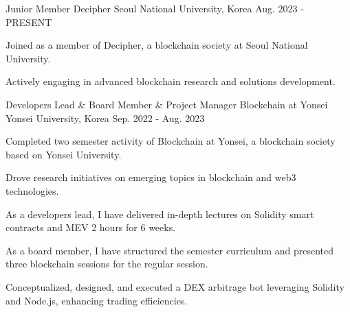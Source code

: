 


\begin{cventries}


\cventry
{Junior Member} %
{Decipher} %
{Seoul National University, Korea} %
{Aug. 2023 - PRESENT} %
{ %
\begin{cvitems}
\item {Joined as a member of Decipher, a blockchain society at Seoul National University.}
\item {Actively engaging in advanced blockchain research and solutions development.}
\end{cvitems}
}


\cventry
{Developers Lead \& Board Member \& Project Manager} %
{Blockchain at Yonsei} %
{Yonsei University, Korea} %
{Sep. 2022 - Aug. 2023} %
{ %
\begin{cvitems}
\item {Completed two semester activity of Blockchain at Yonsei, a blockchain society based on Yonsei University.}
\item {Drove research initiatives on emerging topics in blockchain and web3 technologies.}
\item {As a developers lead, I have delivered in-depth lectures on Solidity smart contracts and MEV 2 hours for 6 weeks.}
\item {As a board member, I have structured the semester curriculum and presented three blockchain sessions for the regular session.}
\item {Conceptualized, designed, and executed a DEX arbitrage bot leveraging Solidity and Node.js, enhancing trading efficiencies.}
\end{cvitems}
}


\end{cventries}

